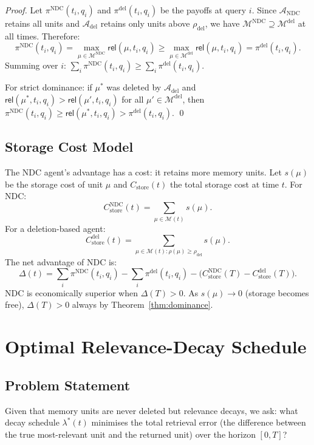 \documentclass[12pt]{article}
\newcommand{\MEM}{\mathcal{M}}
\newcommand{\REL}{\mathsf{rel}}
\begin{document}
\begin{proof}
  Let $\pi^\text{NDC}(t_i, q_i)$ and $\pi^\text{del}(t_i, q_i)$ be the payoffs
  at query $i$.  Since $\mathcal{A}_\text{NDC}$ retains all units and
  $\mathcal{A}_\text{del}$ retains only units above $\rho_\text{del}$, we have
  $\MEM^\text{NDC} \supseteq \MEM^\text{del}$ at all times.  Therefore:
  \[
    \pi^\text{NDC}(t_i, q_i) = \max_{\mu \in \MEM^\text{NDC}}
    \REL(\mu, t_i, q_i) \ge \max_{\mu \in \MEM^\text{del}} \REL(\mu, t_i, q_i)
    = \pi^\text{del}(t_i, q_i).
  \]
  Summing over $i$: $\sum_i \pi^\text{NDC}(t_i, q_i) \ge \sum_i \pi^\text{del}(t_i, q_i)$.

  For strict dominance: if $\mu^*$ was deleted by $\mathcal{A}_\text{del}$
  and $\REL(\mu^*, t_i, q_i) > \REL(\mu', t_i, q_i)$ for all
  $\mu' \in \MEM^\text{del}$, then
  $\pi^\text{NDC}(t_i, q_i) \ge \REL(\mu^*, t_i, q_i) > \pi^\text{del}(t_i, q_i)$.
  \qed
\end{proof}

\subsection{Storage Cost Model}

The NDC agent's advantage has a cost: it retains more memory units.  Let
$s(\mu)$ be the storage cost of unit $\mu$ and $C_\text{store}(t)$ the total
storage cost at time $t$.  For NDC:
\[
  C_\text{store}^\text{NDC}(t) = \sum_{\mu \in \MEM(t)} s(\mu).
\]
For a deletion-based agent:
\[
  C_\text{store}^\text{del}(t) = \sum_{\mu \in \MEM(t) : \rho(\mu) \ge \rho_\text{del}} s(\mu).
\]
The net advantage of NDC is:
\[
  \Delta(t) = \sum_i \pi^\text{NDC}(t_i, q_i) - \sum_i \pi^\text{del}(t_i, q_i)
  - \bigl(C_\text{store}^\text{NDC}(T) - C_\text{store}^\text{del}(T)\bigr).
\]
NDC is economically superior when $\Delta(T) > 0$.  As $s(\mu) \to 0$ (storage
becomes free), $\Delta(T) > 0$ always by Theorem~\ref{thm:dominance}.

\section{Optimal Relevance-Decay Schedule}
\label{sec:decay}

\subsection{Problem Statement}

Given that memory units are never deleted but relevance decays, we ask: what
decay schedule $\lambda^*(t)$ minimises the total retrieval error (the
difference between the true most-relevant unit and the returned unit) over
the horizon $[0, T]$?
\end{document}

